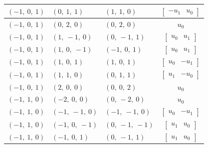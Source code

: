 \documentclass[11pt]{article}
\theoremstyle{definition}
\begin{document}
\begin{longtable}{|l|l|l|c|}
    \hline
    $\left( -1, \  0, \  1\right)$ & $\left( 0, \  1, \  1\right)$ & $\left( 1, \  1, \  0\right)$ & $\left[\begin{matrix}- u_{1} & u_{0}\end{matrix}\right]$ \\
    \hline
    $\left( -1, \  0, \  1\right)$ & $\left( 0, \  2, \  0\right)$ & $\left( 0, \  2, \  0\right)$ & $u_{0}$ \\
    \hline
    $\left( -1, \  0, \  1\right)$ & $\left( 1, \  -1, \  0\right)$ & $\left( 0, \  -1, \  1\right)$ & $\left[\begin{matrix}u_{0} & u_{1}\end{matrix}\right]$ \\
    \hline
    $\left( -1, \  0, \  1\right)$ & $\left( 1, \  0, \  -1\right)$ & $\left( -1, \  0, \  1\right)$ & $\left[\begin{matrix}u_{0} & u_{1}\end{matrix}\right]$ \\
    \hline
    $\left( -1, \  0, \  1\right)$ & $\left( 1, \  0, \  1\right)$ & $\left( 1, \  0, \  1\right)$ & $\left[\begin{matrix}u_{0} & - u_{1}\end{matrix}\right]$ \\
    \hline
    $\left( -1, \  0, \  1\right)$ & $\left( 1, \  1, \  0\right)$ & $\left( 0, \  1, \  1\right)$ & $\left[\begin{matrix}u_{1} & - u_{0}\end{matrix}\right]$ \\
    \hline
    $\left( -1, \  0, \  1\right)$ & $\left( 2, \  0, \  0\right)$ & $\left( 0, \  0, \  2\right)$ & $u_{0}$ \\
    \hline
    $\left( -1, \  1, \  0\right)$ & $\left( -2, \  0, \  0\right)$ & $\left( 0, \  -2, \  0\right)$ & $u_{0}$ \\
    \hline
    $\left( -1, \  1, \  0\right)$ & $\left( -1, \  -1, \  0\right)$ & $\left( -1, \  -1, \  0\right)$ & $\left[\begin{matrix}u_{0} & - u_{1}\end{matrix}\right]$ \\
    \hline
    $\left( -1, \  1, \  0\right)$ & $\left( -1, \  0, \  -1\right)$ & $\left( 0, \  -1, \  -1\right)$ & $\left[\begin{matrix}u_{1} & u_{0}\end{matrix}\right]$ \\
    \hline
    $\left( -1, \  1, \  0\right)$ & $\left( -1, \  0, \  1\right)$ & $\left( 0, \  -1, \  1\right)$ & $\left[\begin{matrix}u_{1} & u_{0}\end{matrix}\right]$ \\

\end{longtable}
\end{document}
